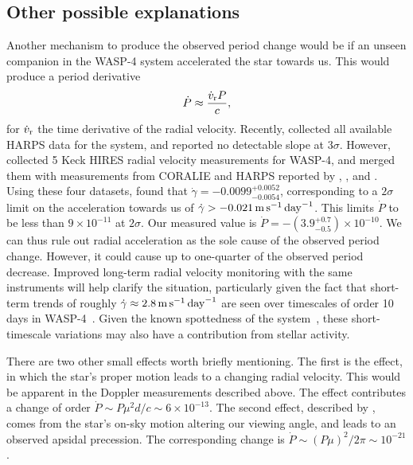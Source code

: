 \documentclass[12pt,twocolumn,tighten]{aastex62}
\begin{document}
\subsection{Other possible explanations}

Another mechanism to produce the observed period change would be if an
unseen companion in the WASP-4 system accelerated the star towards us.
This would produce a period derivative
\begin{equation}
	\dot{P} \approx \frac{\dot{v}_{\rm r} P}{c},
\end{equation}
for $\dot{v}_{\rm r}$ the time derivative of the radial velocity.
Recently, \citet{bonomo_gaps_2017} collected all available HARPS data
for the system, and reported no detectable slope at $3\sigma$.
However, \citet{knutson_friends_2014} collected 5 Keck HIRES radial
velocity measurements for WASP-4, and merged them with measurements
from CORALIE and HARPS reported by \citet{wilson_wasp-4b_2008},
\citet{pont_determining_2011}, and \citet{husnoo_observational_2012}.
Using these four datasets, \citet{knutson_friends_2014} found that
$\dot{\gamma} = -0.0099^{+0.0052}_{-0.0054}$, corresponding to a
$2\sigma$ limit on the acceleration towards us of $\dot{\gamma} > -
0.021 \,{\rm m}\,{\rm s}^{-1}\,{\rm day}^{-1}$.  This limits $\dot{P}$
to be less than $9\times 10^{-11}$ at $2\sigma$.  
Our measured value is $\dot{P} = -(3.9^{+0.7}_{-0.5})\times 10^{-10}$.
We can thus rule out radial acceleration as the sole cause of the
observed period change.  However, it could cause up to one-quarter of
the observed period decrease.  Improved long-term radial velocity
monitoring with the same instruments will help clarify the situation,
particularly given the fact that short-term trends of roughly
$\dot{\gamma} \approx 2.8 \,{\rm m}\,{\rm s}^{-1}\,{\rm day}^{-1}$ are
seen over timescales of order 10 days in
WASP-4~\citep{husnoo_observational_2012}.  Given the known spottedness
of the system~\citep{sanchis-ojeda_starspots_2011}, these
short-timescale variations may also have a contribution from stellar
activity.

There are two other small effects worth briefly mentioning.  The first
is the \citet{shklovskii_possible_1970} effect, in which the star's
proper motion leads to a changing radial velocity.  This would be
apparent in the Doppler measurements described above.  The effect
contributes a change of order $\dot{P} \sim P\mu^2 d/ c \sim
6\times10^{-13}$.  The second effect, described by
\citet{rafikov_stellar_2009}, comes from the star's on-sky motion
altering our viewing angle, and leads to an observed apsidal
precession.  The corresponding change is $\dot{P} \sim (P\mu)^2/2\pi
\sim 10^{-21}$.
\end{document}
